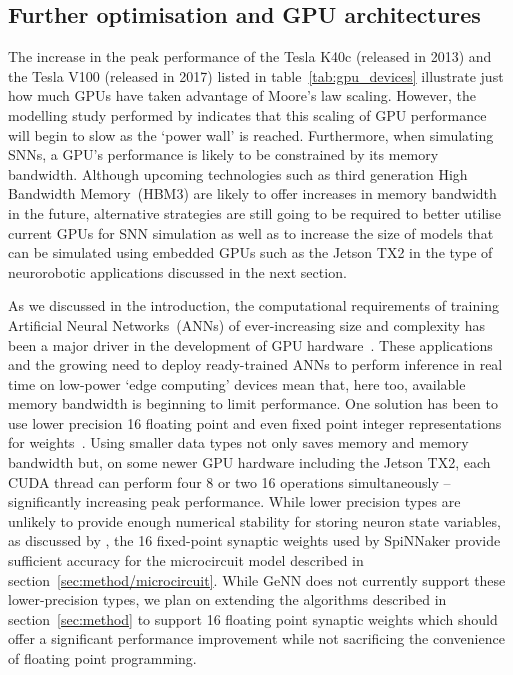 \documentclass[utf8]{frontiersSCNS} %
\begin{document}
\subsection{Further optimisation and GPU architectures}
The increase in the peak performance of the Tesla K40c (released in 2013) and the Tesla V100 (released in 2017) listed in table~\ref{tab:gpu_devices} illustrate just how much GPUs have taken advantage of Moore's law scaling.
However, the modelling study performed by \citet{Esmaeilzadeh2012} indicates that this scaling of GPU performance will begin to slow as the `power wall' is reached.
Furthermore, when simulating SNNs, a GPU's performance is likely to be constrained by its memory bandwidth.
Although upcoming technologies such as third generation High Bandwidth Memory~(HBM3) are likely to offer increases in memory bandwidth in the future, alternative strategies are still going to be required to better utilise current GPUs for SNN simulation as well as to increase the size of models that can be simulated using embedded GPUs such as the Jetson TX2 in the type of neurorobotic applications discussed in the next section.

As we discussed in the introduction, the computational requirements of training Artificial Neural Networks~(ANNs) of ever-increasing size and complexity has been a major driver in the development of GPU hardware~\citep{Schmidhuber2015}.
These applications and the growing need to deploy ready-trained ANNs to perform inference in real time on low-power `edge computing' devices mean that, here too, available memory bandwidth is beginning to limit performance.
One solution has been to use lower precision \SI{16}{\bit} floating point and even fixed point integer representations for weights~\citep{Micikevicius2017}.
Using smaller data types not only saves memory and memory bandwidth but, on some newer GPU hardware including the Jetson TX2, each CUDA thread can perform four \SI{8}{\bit} or two \SI{16}{\bit} operations simultaneously -- significantly increasing peak performance.
While lower precision types are unlikely to provide enough numerical stability for storing neuron state variables, as discussed by \citet{VanAlbada2018}, the \SI{16}{\bit} fixed-point synaptic weights used by SpiNNaker provide sufficient accuracy for the microcircuit model described in section~\ref{sec:method/microcircuit}.
While GeNN does not currently support these lower-precision types, we plan on extending the algorithms described in section~\ref{sec:method} to support \SI{16}{\bit} floating point synaptic weights which should offer a significant performance improvement while not sacrificing the convenience of floating point programming.
\end{document}
